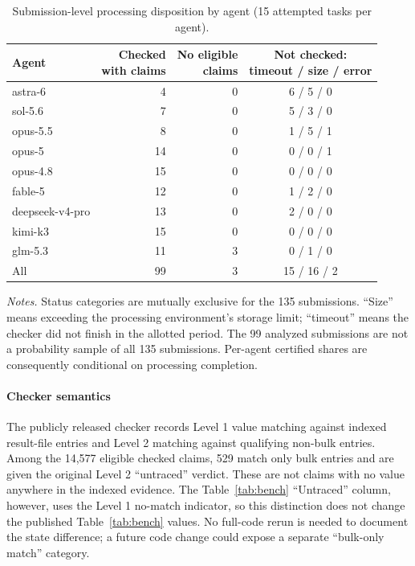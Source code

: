 \documentclass[preprint,12pt,authoryear]{elsarticle}
\begin{document}
\begin{table}[!htbp]
\centering
\caption{Submission-level processing disposition by agent (15 attempted tasks per agent).}
\label{tab:disposition}
\footnotesize
\begin{tabular}{@{}lrrc@{}}
\toprule
Agent & \shortstack{Checked\\with claims} & \shortstack{No eligible\\claims} & \shortstack{Not checked:\\timeout / size / error}\\
\midrule
astra-6 & 4 & 0 & 6 / 5 / 0\\
sol-5.6 & 7 & 0 & 5 / 3 / 0\\
opus-5.5 & 8 & 0 & 1 / 5 / 1\\
opus-5 & 14 & 0 & 0 / 0 / 1\\
opus-4.8 & 15 & 0 & 0 / 0 / 0\\
fable-5 & 12 & 0 & 1 / 2 / 0\\
deepseek-v4-pro & 13 & 0 & 2 / 0 / 0\\
kimi-k3 & 15 & 0 & 0 / 0 / 0\\
glm-5.3 & 11 & 3 & 0 / 1 / 0\\
\midrule
All & 99 & 3 & 15 / 16 / 2\\
\bottomrule
\end{tabular}

\par\smallskip
{\footnotesize\raggedright \textit{Notes.} Status categories are mutually exclusive for the 135 submissions. ``Size'' means exceeding the processing environment's storage limit; ``timeout'' means the checker did not finish in the allotted period. The 99 analyzed submissions are not a probability sample of all 135 submissions. Per-agent certified shares are consequently conditional on processing completion.\par}
\end{table}

\paragraph{Checker semantics} The publicly released checker records Level 1 value matching against indexed result-file entries and Level 2 matching against qualifying non-bulk entries. Among the 14,577 eligible checked claims, 529 match only bulk entries and are given the original Level 2 ``untraced'' verdict. These are not claims with no value anywhere in the indexed evidence. The Table~\ref{tab:bench} ``Untraced'' column, however, uses the Level 1 no-match indicator, so this distinction does not change the published Table~\ref{tab:bench} values. No full-code rerun is needed to document the state difference; a future code change could expose a separate ``bulk-only match'' category.
\end{document}
